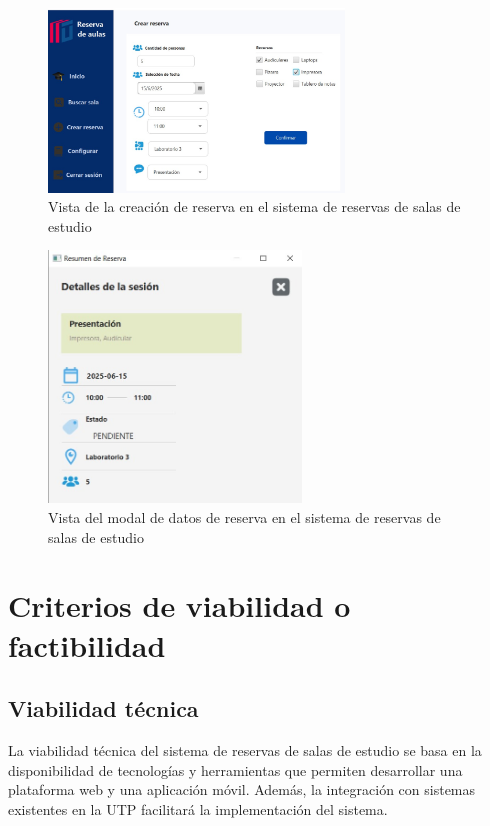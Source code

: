 \documentclass{article}
\begin{document}
      \begin{figure}[H]
      \centering
      \includegraphics[width=0.7\textwidth]{assets/reserva.jpeg}
      \caption{Vista de la creación de reserva en el sistema de reservas de salas de estudio}
      \label{fig:crear_reserva}
      \end{figure}

      \begin{figure}[H]
      \centering
      \includegraphics[width=0.6\textwidth]{assets/reservacion.jpeg}
      \caption{Vista del modal de datos de reserva en el sistema de reservas de salas de estudio}
      \label{fig:modal_reserva}
      \end{figure}

      \section{Criterios de viabilidad o factibilidad}

      \subsection{Viabilidad técnica}

      La viabilidad técnica del sistema de reservas de salas de estudio se basa en la disponibilidad de tecnologías y herramientas que permiten desarrollar una plataforma web y una aplicación móvil. Además, la integración con sistemas existentes en la UTP facilitará la implementación del sistema.
\end{document}
